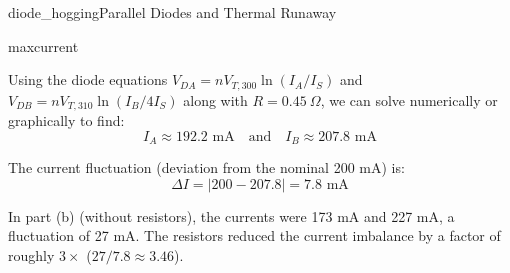 \begin{mainquestion}{diode_hogging}{Parallel Diodes and Thermal Runaway}
\begin{partquestion}{maxcurrent}
\begin{answer}
        Using the diode equations $V_{DA} = n V_{T,300} \ln(I_A/I_S)$ and $V_{DB} = n V_{T,310} \ln(I_B/4I_S)$ along with $R=0.45 \ \Omega$, we can solve numerically or graphically to find:
        \[ I_A \approx 192.2 \text{ mA} \quad \text{and} \quad I_B \approx 207.8 \text{ mA} \]
        
        The current fluctuation (deviation from the nominal 200 mA) is:
        \[ \Delta I = |200 - 207.8| = 7.8 \text{ mA} \]
        
        In part (b) (without resistors), the currents were 173 mA and 227 mA, a fluctuation of 27 mA. The resistors reduced the current imbalance by a factor of roughly $3\times$ ($27/7.8 \approx 3.46$).
\end{answer}

\end{partquestion}

\end{mainquestion}
